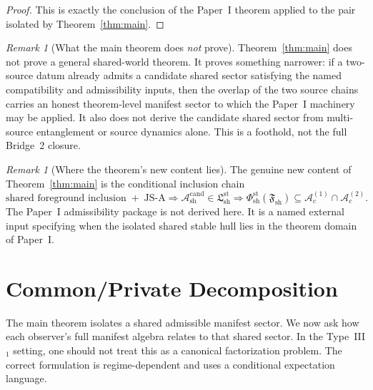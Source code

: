 \documentclass[12pt]{article}
\theoremstyle{definition}
\theoremstyle{remark}
\newtheorem{remark}[theorem]{Remark}
\begin{document}
\begin{proof}
This is exactly the conclusion of the Paper~I theorem applied to the
pair isolated by Theorem~\ref{thm:main}.
\end{proof}

\begin{remark}[What the main theorem does \emph{not} prove]
Theorem~\ref{thm:main} does not prove a general shared-world theorem.
It proves something narrower: if a two-source datum already admits a
candidate shared sector satisfying the named compatibility and
admissibility inputs, then the overlap of the two source chains carries
an honest theorem-level manifest sector to which the Paper~I machinery
may be applied. It also does not derive the candidate shared sector from
multi-source entanglement or source dynamics alone. This is a foothold,
not the full Bridge~2 closure.
\end{remark}

\begin{remark}[Where the theorem's new content lies]
The genuine new content of Theorem~\ref{thm:main} is the conditional
inclusion chain
\[
\text{shared foreground inclusion}
\;+\;
\text{JS-A}
\Longrightarrow
\mathcal A_{\mathrm{sh}}^{\mathrm{cand}}
\in
\mathfrak L_{\mathrm{sh}}^{\mathrm{st}}
\Longrightarrow
\Phi_{\mathrm{sh}}^{\mathrm{st}}(\mathfrak F_{\mathrm{sh}})
\subseteq
\mathcal A_c^{(1)}\cap\mathcal A_c^{(2)}.
\]
The Paper~I admissibility package is not derived here. It is a named
external input specifying when the isolated shared stable hull lies in
the theorem domain of Paper~I.
\end{remark}

\section{Common/Private Decomposition}\label{sec:cp}

The main theorem isolates a shared admissible manifest sector. We now
ask how each observer's full manifest algebra relates to that shared
sector. In the Type~III\(_1\) setting, one should not treat this as a
canonical factorization problem. The correct formulation is
regime-dependent and uses a conditional expectation language.
\end{document}
